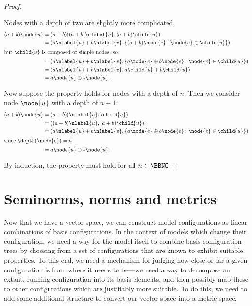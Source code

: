 \begin{definition}
\begin{proposition}
\begin{proof}
\begin{description}
      Nodes with a depth of two are slightly more complicated, 
      \begin{align}
        (a + b)\node{u} &= (a + b) ((a + b)\nlabel{u}, (a + b)\child{u}) \\
        &= (a\nlabel{u} + b\nlabel{u}, \{(a + b)\node{e}:\node{e}\in\child{u}\}) \\
        \intertext{but $\child{u}$ is composed of simple nodes, so,}
        &= (a\nlabel{u} + b\nlabel{u}, \{a \node{e} \oplus b \node{e}:\node{e}\in\child{u}\}) \\
        &= (a\nlabel{u} + b\nlabel{u}, a\child{u} + b\child{u}) \\
        &= a \node{u} \oplus b\node{u}.
      \end{align}

      Now suppose the property holds for nodes with a depth of $n$.
      Then we consider node $\node{u}$ with a depth of $n+1$:
      \begin{align}
        (a + b)\node{u} &= (a + b) (\nlabel{u}, \child{u}) \\
        &= ((a + b)\nlabel{u}, (a + b)\child{u}), \\
        &= (a\nlabel{u} + b\nlabel{u}, \{a \node{e} \oplus b \node{e}:\node{e}\in\child{u}\}) \\
        \intertext{since $\depth(\node{e}) = n$}
        &= a \node{u} \oplus b \node{u}.
      \end{align}

    \end{description}
    By induction, the property must hold for all $n \in\BBNO$
  \end{proof}
\end{proposition}

\section{Seminorms, norms and metrics} %

Now that we have a vector space, we can construct model configurations
as linear combinations of basis configurations. In the context of
models which change their configuration, we need a way for the model
itself to combine basis configuration trees by choosing from a set of
configurations that are known to exhibit suitable properties.  To this
end, we need a mechanism for judging how close or far a given
configuration is from where it needs to be---we need a way to
decompose an extant, running configuration into its basis elements,
and then possibly map these to other configurations which are
justifiably more suitable.  To do this, we need to add some additional
structure to convert our vector space into a metric space.


\end{definition}
